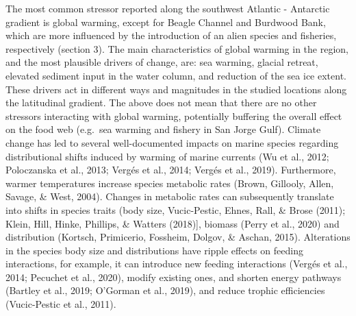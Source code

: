 \documentclass[
]{article}
\begin{document}
The most common stressor reported along the southwest Atlantic -
Antarctic gradient is global warming, except for Beagle Channel and
Burdwood Bank, which are more influenced by the introduction of an alien
species and fisheries, respectively (section 3). The main
characteristics of global warming in the region, and the most plausible
drivers of change, are: sea warming, glacial retreat, elevated sediment
input in the water column, and reduction of the sea ice extent. These
drivers act in different ways and magnitudes in the studied locations
along the latitudinal gradient. The above does not mean that there are
no other stressors interacting with global warming, potentially
buffering the overall effect on the food web (e.g.~sea warming and
fishery in San Jorge Gulf). Climate change has led to several
well-documented impacts on marine species regarding distributional
shifts induced by warming of marine currents (Wu et al., 2012;
Poloczanska et al., 2013; Vergés et al., 2014; Vergés et al., 2019).
Furthermore, warmer temperatures increase species metabolic rates
(Brown, Gillooly, Allen, Savage, \& West, 2004). Changes in metabolic
rates can subsequently translate into shifts in species traits (body
size, Vucic-Pestic, Ehnes, Rall, \& Brose (2011); Klein, Hill, Hinke,
Phillips, \& Watters (2018){]}, biomass (Perry et al., 2020) and
distribution (Kortsch, Primicerio, Fossheim, Dolgov, \& Aschan, 2015).
Alterations in the species body size and distributions have ripple
effects on feeding interactions, for example, it can introduce new
feeding interactions (Vergés et al., 2014; Pecuchet et al., 2020),
modify existing ones, and shorten energy pathways (Bartley et al., 2019;
O'Gorman et al., 2019), and reduce trophic efficiencies (Vucic-Pestic et
al., 2011).
\end{document}
